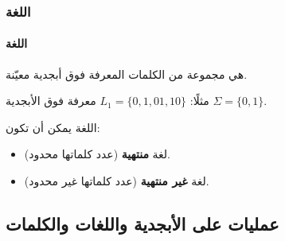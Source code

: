 \documentclass[12pt]{article}
\begin{document}
\subsubsection{اللغة}

\paragraph{اللغة} هي مجموعة من الكلمات المعرفة فوق أبجدية معيّنة.

مثلًا:
$L_1 = \{0, 1, 01, 10\}$ معرفة فوق الأبجدية $\Sigma = \{0, 1\}$.

اللغة يمكن أن تكون:
\begin{itemize}
    \item لغة \textbf{منتهية} (عدد كلماتها محدود).
    \item لغة \textbf{غير منتهية} (عدد كلماتها غير محدود).
\end{itemize}

\subsection{عمليات على الأبجدية واللغات والكلمات}
\end{document}

